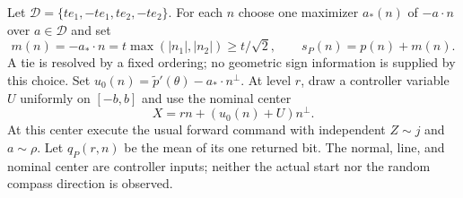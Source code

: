 Let $\mathcal D=\{te_1,-te_1,te_2,-te_2\}$. For each $n$ choose
one maximizer $a_*(n)$ of $-a\cdot n$ over $a\in\mathcal D$ and set
\begin{equation}\label{eq:compass-support}
 m(n)=-a_*\cdot n=t\max(|n_1|,|n_2|)\ge t/\sqrt2,
 \qquad s_P(n)=p(n)+m(n).
\end{equation}
A tie is resolved by a fixed ordering; no geometric sign information
is supplied by this choice. Set
$u_0(n)=\widetilde p'(\theta)-a_*\cdot n^\perp$.
At level $r$, draw a controller variable $U$ uniformly on $[-b,b]$
and use the nominal center
\begin{equation}\label{eq:line-command}
             X=r n+(u_0(n)+U)n^\perp.
\end{equation}
At this center execute the usual forward command with independent
$Z\sim j$ and $a\sim\rho$. Let $q_P(r,n)$ be the mean of its one
returned bit. The normal, line, and nominal center are controller
inputs; neither the actual start nor the random compass direction is
observed.

